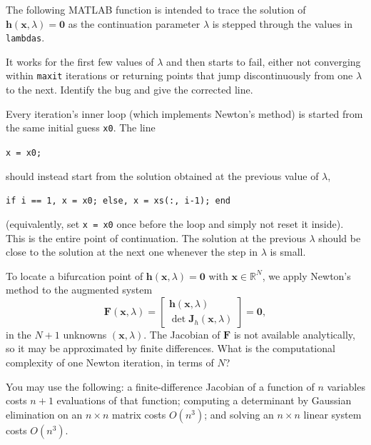 \begin{exercise} %
    
    The following MATLAB function is intended to trace the solution of $\mathbf{h}(\mathbf{x}, \lambda) = \mathbf{0}$ as the continuation parameter $\lambda$ is stepped through the values in \texttt{lambdas}.
    
    It works for the first few values of $\lambda$ and then starts to fail, either not converging within \texttt{maxit} iterations or returning points that jump discontinuously from one $\lambda$ to the next. Identify the bug and give the corrected line.
    
\end{exercise}

\begin{solution}
    
    Every iteration's inner loop (which implements Newton's method)  is started from the same initial guess \texttt{x0}. The line
    \begin{center}\texttt{x = x0;}\end{center}
    should instead start from the solution obtained at the previous value of $\lambda$,
    \begin{center}\texttt{if i == 1, x = x0; else, x = xs(:, i-1); end}\end{center}
    (equivalently, set \texttt{x = x0} once before the loop and simply not reset it inside). This is the entire point of continuation. The solution at the previous $\lambda$ should be close to the solution at the next one whenever the step in $\lambda$ is small.
    
\end{solution}


\begin{exercise} %
    
    To locate a bifurcation point of $\mathbf{h}(\mathbf{x},\lambda) = \mathbf{0}$ with $\mathbf{x} \in \mathbb{R}^N$, we apply Newton's method to the augmented system
    \[
        \mathbf{F}(\mathbf{x}, \lambda) =
        \begin{bmatrix}
            \mathbf{h}(\mathbf{x}, \lambda) \\
            \det \mathbf{J}_h(\mathbf{x}, \lambda)
        \end{bmatrix} = \mathbf{0} ,
    \]
    in the $N+1$ unknowns $(\mathbf{x}, \lambda)$. The Jacobian of $\mathbf{F}$ is not available analytically, so it may be approximated by finite differences. What is the computational complexity of one Newton iteration, in terms of $N$?

    You may use the following: a finite-difference Jacobian of a function of $n$ variables costs $n+1$ evaluations of that function; computing a determinant by Gaussian elimination on an $n \times n$ matrix costs $O(n^3)$; and solving an $n \times n$ linear system costs $O(n^3)$.
    
\end{exercise}

